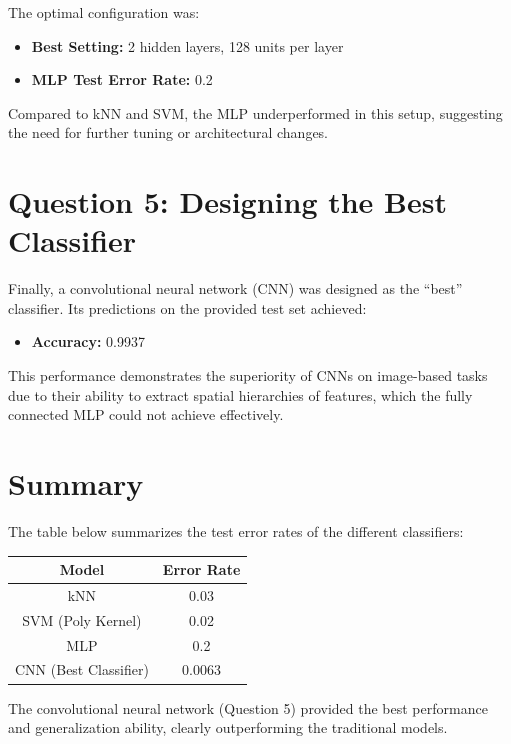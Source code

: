 \documentclass[a4paper,12pt]{article}
\begin{document}
\noindent The optimal configuration was:

\begin{itemize}
  \item \textbf{Best Setting:} 2 hidden layers, 128 units per layer
  \item \textbf{MLP Test Error Rate:} 0.2
\end{itemize}

Compared to kNN and SVM, the MLP underperformed in this setup, suggesting the need for further tuning or architectural changes.

\section*{Question 5: Designing the Best Classifier}
Finally, a convolutional neural network (CNN) was designed as the ``best'' classifier. Its predictions on the provided test set achieved:

\begin{itemize}
  \item \textbf{Accuracy:} 0.9937
\end{itemize}

This performance demonstrates the superiority of CNNs on image-based tasks due to their ability to extract spatial hierarchies of features, which the fully connected MLP could not achieve effectively.

\section*{Summary}
The table below summarizes the test error rates of the different classifiers:

\begin{center}
\begin{tabular}{|c|c|}
\hline
\textbf{Model} & \textbf{Error Rate} \\
\hline
kNN & 0.03 \\
SVM (Poly Kernel) & 0.02 \\
MLP & 0.2 \\
CNN (Best Classifier) & 0.0063 \\
\hline
\end{tabular}
\end{center}

The convolutional neural network (Question 5) provided the best performance and generalization ability, clearly outperforming the traditional models.
\end{document}
